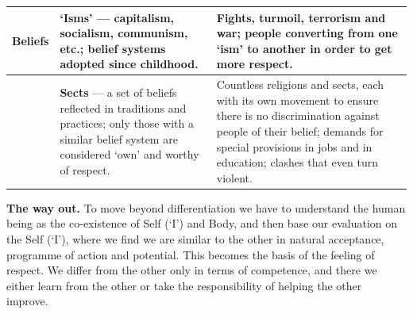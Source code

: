 \begin{longtable}{P{22mm} P{60mm} P{65mm}}
\textbf{Beliefs} & \textbf{`Isms'} --- capitalism, socialism, communism, etc.;
  belief systems adopted since childhood. &
  Fights, turmoil, terrorism and war; people converting from one `ism' to
  another in order to get more respect. \\ \hline
 & \textbf{Sects} --- a set of beliefs reflected in traditions and practices;
  only those with a similar belief system are considered `own' and worthy of
  respect. &
  Countless religions and sects, each with its own movement to ensure there is
  no discrimination against people of their belief; demands for special
  provisions in jobs and in education; clashes that even turn violent.
  \\ \hline
\end{longtable}

\textbf{The way out.} To move beyond differentiation we have to understand the
human being as the co-existence of Self (`I') and Body, and then base our
evaluation on the Self (`I'), where we find we are similar to the other in
natural acceptance, programme of action and potential. This becomes the basis
of the feeling of respect. We differ from the other only in terms of
competence, and there we either learn from the other or take the
responsibility of helping the other improve.


